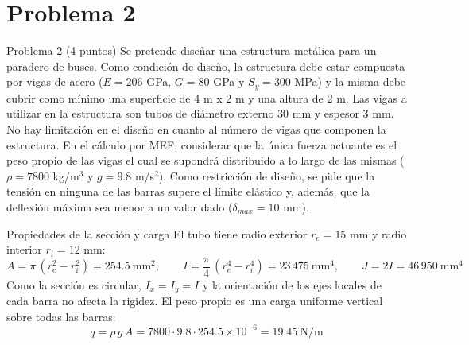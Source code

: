\newpage
\section*{Problema 2}

\begin{enunciado}{Problema 2 (4 puntos)}
    Se pretende dise\~nar una estructura met\'alica para un paradero de buses.
    Como condici\'on de dise\~no, la estructura debe estar compuesta por vigas
    de acero ($E = 206$ GPa, $G = 80$ GPa y $S_y = 300$ MPa) y la misma debe
    cubrir como m\'inimo una superficie de 4 m x 2 m y una altura de 2 m. Las
    vigas a utilizar en la estructura son tubos de di\'ametro externo 30 mm y
    espesor 3 mm. No hay limitaci\'on en el dise\~no en cuanto al n\'umero de
    vigas que componen la estructura. En el c\'alculo por MEF, considerar que
    la \'unica fuerza actuante es el peso propio de las vigas el cual se
    supondr\'a distribuido a lo largo de las mismas ($\rho = 7800$ kg/m$^3$ y
    $g = 9.8$ m/s$^2$). Como restricci\'on de dise\~no, se pide que la tensi\'on
    en ninguna de las barras supere el l\'imite el\'astico y, adem\'as, que la
    deflexi\'on m\'axima sea menor a un valor dado ($\delta_{max} = 10$ mm).
\end{enunciado}

\vspace{0.5cm}


\begin{desarrollo}{Propiedades de la sección y carga}
El tubo tiene radio exterior $r_e=15$ mm y radio interior $r_i=12$ mm:
$$A=\pi\,(r_e^2-r_i^2)=254.5\ \text{mm}^2,\qquad
I=\frac{\pi}{4}\,(r_e^4-r_i^4)=23\,475\ \text{mm}^4,\qquad
J=2I=46\,950\ \text{mm}^4$$
Como la sección es circular, $I_x=I_y=I$ y la orientación de los ejes locales
de cada barra no afecta la rigidez. El peso propio es una carga uniforme
vertical sobre todas las barras:
$$q=\rho\,g\,A=7800\cdot 9.8\cdot 254.5\times10^{-6}=19.45\ \text{N/m}$$
\end{desarrollo}


